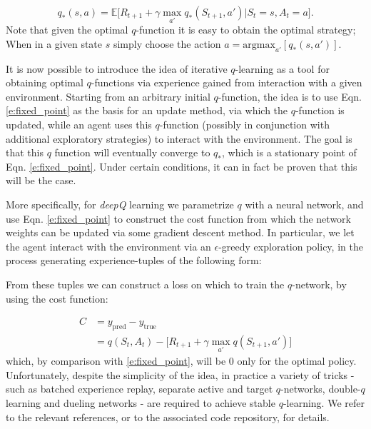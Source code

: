 \documentclass[twocolumn,preprintnumbers,amsmath,amssymb,notitlepage,nofootinbib,longbibliography,superscriptaddress,aps,pra,10pt]{revtex4-1}
\begin{document}
    \begin{equation}\label{e:fixed_point}
        q_*(s,a) = \mathbb{E}\big[R_{t+1} + \gamma\max_{a'}q_{*}(S_{t+1},a')\big|S_t = s, A_t = a \big].
    \end{equation}
    Note that given the optimal $q$-function it is easy to obtain the optimal strategy; When in a given state $s$ simply choose the action $a = \mathrm{argmax}_{a'}[q_*(s,a')]$.

    It is now possible to introduce the idea of iterative $q$-learning as a tool for obtaining optimal $q$-functions via experience gained from interaction with a given environment. 
    Starting from an arbitrary initial $q$-function, the idea is to use Eqn. \eqref{e:fixed_point} as the basis for an update method, via which the $q$-function is updated, while an agent uses this $q$-function (possibly in conjunction with additional exploratory strategies) to interact with the environment. 
    The goal is that this $q$ function will eventually converge to $q_*$, which is a stationary point of Eqn. \eqref{e:fixed_point}. 
    Under certain conditions, it can in fact be proven that this will be the case.

    More specifically, for \textit{deepQ} learning we parametrize $q$ with a neural network, and use Eqn. \eqref{e:fixed_point} to construct the cost function from which the network weights can be updated via some gradient descent method. In particular, we let the agent interact with the environment via an $\epsilon$-greedy exploration policy, in the process generating experience-tuples of the following form:

    \begin{equation}
        [S_t,A_t,R_{t+1},S_{t+1}]
    \end{equation}
    From these tuples we can construct a loss on which to train the $q$-network, by using the cost function:

    \begin{align} 
    C &= y_{\mathrm{pred}} - y_{\mathrm{true}}\\
    &= q(S_t,A_t) - \big[R_{t+1} + \gamma\max_{a'}q(S_{t+1},a') \big]
    \end{align}
    which, by comparison with \eqref{e:fixed_point}, will be 0 only for the optimal policy. Unfortunately, despite the simplicity of the idea, in practice a variety of tricks - such as batched experience replay, separate active and target $q$-networks, double-$q$ learning and dueling networks - are required to achieve stable $q$-learning. We refer to the relevant references, or to the associated code repository, for details.
\end{document}
